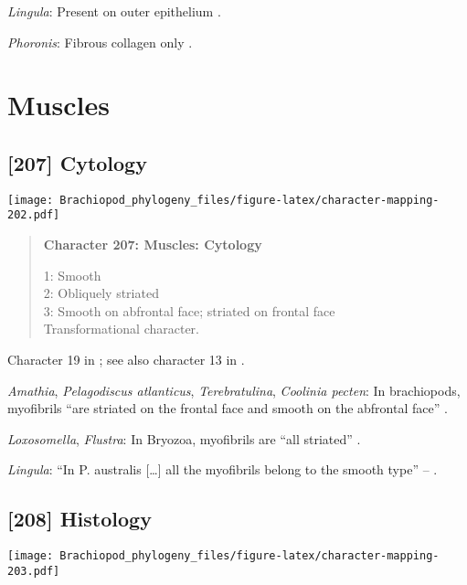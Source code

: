\documentclass[openany]{book}
\theoremstyle{definition}
\theoremstyle{definition}
\theoremstyle{definition}
\theoremstyle{remark}
\begin{document}
\hypertarget{Lingula-coding-206}{}
\emph{Lingula}: Present on outer epithelium \citep{BereiterHahn1984}.

\hypertarget{Phoronis-coding-206}{}
\emph{Phoronis}: Fibrous collagen only \citep{BereiterHahn1984}.

\section{Muscles}\label{muscles}

\subsection*{{[}207{]} Cytology}\label{cytology}

\texttt{[image: Brachiopod\_phylogeny\_files/figure-latex/character-mapping-202.pdf]}

\begin{quote}
\textbf{Character 207: Muscles: Cytology}

1: Smooth\\
2: Obliquely striated\\
3: Smooth on abfrontal face; striated on frontal face\\
Transformational character.
\end{quote}

Character 19 in \citet{Haszprunar1996}; see also character 13 in
\citet{Haszprunar2000}.

\hypertarget{Amathia-coding-207}{}
\emph{Amathia}, \emph{Pelagodiscus atlanticus}, \emph{Terebratulina},
\emph{Coolinia pecten}: In brachiopods, myofibrils ``are striated on the
frontal face and smooth on the abfrontal face'' \citep{Pardos1991}.

\hypertarget{Flustra-coding-207}{}
\emph{Loxosomella}, \emph{Flustra}: In Bryozoa, myofibrils are ``all
striated'' \citep{Pardos1991}.

\hypertarget{Lingula-coding-207}{}
\emph{Lingula}: ``In P. australis {[}\ldots{}{]} all the myofibrils
belong to the smooth type'' -- \citet{Pardos1991}.

\subsection*{{[}208{]} Histology}\label{histology}

\texttt{[image: Brachiopod\_phylogeny\_files/figure-latex/character-mapping-203.pdf]}
\end{document}
